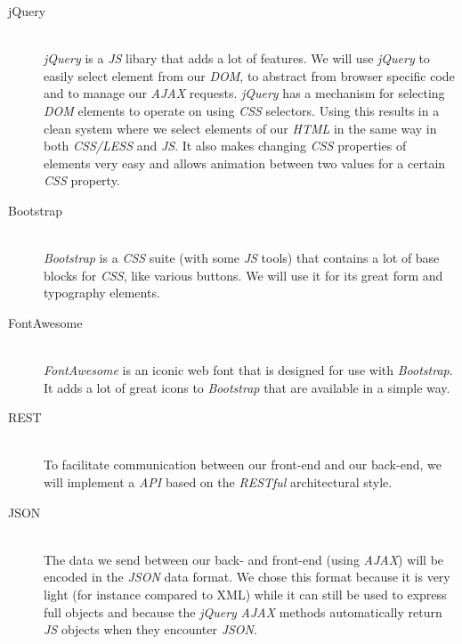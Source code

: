 \begin{description}
	\item[jQuery]\hfill\\
		\textit{jQuery} is a \textit{JS} libary that adds a lot of features. 
		We will use \textit{jQuery} to easily select element from our \textit{DOM}, to abstract from browser specific code and to manage our \textit{AJAX} requests.
		\textit{jQuery} has a mechanism for selecting \textit{DOM} elements to operate on using \textit{CSS} selectors.
		Using this results in a clean system where we select elements of our \textit{HTML} in the same way in both \textit{CSS/LESS} and \textit{JS}.
		It also makes changing \textit{CSS} properties of elements very easy and allows animation between two values for a certain \textit{CSS} property.

	\item[Bootstrap]\hfill\\
		\textit{Bootstrap} is a \textit{CSS} suite (with some \textit{JS} tools) that contains a lot of base blocks for \textit{CSS}, like various buttons.
		We will use it for its great form and typography elements.

	\item[FontAwesome]\hfill\\
		\textit{FontAwesome} is an iconic web font that is designed for use with \textit{Bootstrap}.
		It adds a lot of great icons to \textit{Bootstrap} that are available in a simple way. 

	\item[REST]\hfill\\
		To facilitate communication between our front-end and our back-end, we will implement
		a \textit{API} based on the \textit{RESTful} architectural style.

	\item[JSON]\hfill\\
		The data we send between our back- and front-end (using \textit{AJAX}) will be encoded in the \textit{JSON} data format.
		We chose this format because it is very light (for instance compared to XML) while it can still be used to express
		full objects and because the \textit{jQuery} \textit{AJAX} methods automatically return \textit{JS} objects when
		they encounter \textit{JSON}.
\end{description}

